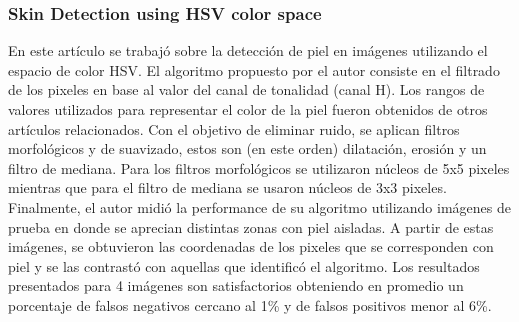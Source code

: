 	
	
	
	\subsubsection{Skin Detection using HSV color space \cite{skin09}}
	En este art\'iculo se trabaj\'o sobre la detecci\'on de piel en im\'agenes utilizando el espacio de color HSV. El algoritmo propuesto 
por el autor consiste en el filtrado de los pixeles en base al valor del canal de tonalidad (canal H). Los rangos de valores utilizados para 
representar el color de la piel fueron obtenidos de otros art\'iculos 
relacionados. Con el objetivo de eliminar ruido, se aplican filtros morfol\'ogicos y de suavizado, estos son (en este orden) dilataci\'on, erosi\'on y un filtro de mediana. Para los filtros morfol\'ogicos se utilizaron n\'ucleos de 5x5 pixeles mientras que para el filtro de mediana se usaron n\'ucleos de 3x3 pixeles. Finalmente, el autor midi\'o la performance de su algoritmo utilizando im\'agenes de prueba en donde se aprecian distintas zonas con piel aisladas. A partir de estas im\'agenes, se obtuvieron las coordenadas de los pixeles que se corresponden con piel y se las contrast\'o con aquellas que identific\'o el algoritmo. Los resultados presentados para 4 im\'agenes son satisfactorios obteniendo en promedio un porcentaje de falsos negativos cercano al 1\% y de falsos positivos menor al 6\%.

